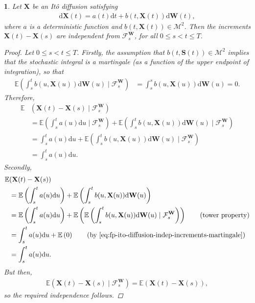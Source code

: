 \documentclass[english]{article}
\numberwithin{equation}{section}
\numberwithin{figure}{section}
\theoremstyle{bolddescit}
\theoremstyle{definition}
\theoremstyle{definition}
\theoremstyle{plain}
\newtheorem{lemma}[theorem]{\protect\lemmaname}
\theoremstyle{plain}
\theoremstyle{bolddesc}
\theoremstyle{plain}
\theoremstyle{remark}
\providecommand{\lemmaname}{Lemma}
\begin{document}
\begin{lemma}\label{lem:fp-ito-diffusion-indep-increments}
  Let $\mathbf{X}$ be an It\^o diffusion satisfying
  \begin{align}\label{eq:fp-ito-diffusion-deterministic-drift}
    \mathrm{d}\mathbf{X}(t) = a(t) \mathrm{d}t + b(t,\mathbf{X}(t)) \mathrm{d}\mathbf{W}(t),
  \end{align}
  where $a$ is a deterministic function and $b(t,\mathbf{X}(t)) \in \mathcal{M}^2$. Then the increments $\mathbf{X}(t) - \mathbf{X}(s)$ are independent from $\mathcal{F}^\mathbf{W}_s$, for all $0 \le s < t \le T$.

  \begin{proof}
    Let $0 \le s < t \le T$. Firstly, the assumption that $b(t,\mathbf{S}(t)) \in \mathcal{M}^2$ implies that the stochastic integral is a martingale (as a function of the upper endpoint of integration), so that
    \begin{align}\label{eq:fp-ito-diffusion-indep-increments-martingale}
      \mathbb{E}\left(\int_s^t b(u,\mathbf{X}(u)) \mathrm{d}\mathbf{W}(u) \mid \mathcal{F}^\mathbf{W}_s\right)
      &= \int_s^s b(u,\mathbf{X}(u)) \mathrm{d}\mathbf{W}(u) = 0.
    \end{align}
    Therefore,
    \begin{align*}
      \mathbb{E}&(\mathbf{X}(t) - \mathbf{X}(s) \mid \mathcal{F}^\mathbf{W}_s)\\
      &= \mathbb{E}\left(\int_s^t a(u) \mathrm{d}u \mid \mathcal{F}^\mathbf{W}_s\right) + \mathbb{E}\left(\int_s^t b(u,\mathbf{X}(u)) \mathrm{d}\mathbf{W}(u) \mid \mathcal{F}^\mathbf{W}_s\right)\\
      &= \int_s^t a(u) \mathrm{d}u + \mathbb{E}\left(\int_s^t b(u,\mathbf{X}(u)) \mathrm{d}\mathbf{W}(u) \mid \mathcal{F}^\mathbf{W}_s\right) \tag{$a$ deterministic}\\
      &= \int_s^t a(u) \mathrm{d}u.
    \end{align*}
    Secondly,
    \begin{align*}
      \mathbb{E}&(\mathbf{X}(t) - \mathbf{X}(s))\\
      &= \mathbb{E}\left(\int_s^t a(u) \mathrm{d}u\right) + \mathbb{E}\left(\int_s^t b(u,\mathbf{X}(u)) \mathrm{d}\mathbf{W}(u)\right)\\
      &= \mathbb{E}\left(\int_s^t a(u) \mathrm{d}u\right) + \mathbb{E}\left(\mathbb{E}\left(\int_s^t b(u,\mathbf{X}(u)) \mathrm{d}\mathbf{W}(u) \mid \mathcal{F}^\mathbf{W}_s\right)\right) \tag{tower property}\\
      &= \int_s^t a(u) \mathrm{d}u + \mathbb{E}\left(0\right) \tag{by \eqref{eq:fp-ito-diffusion-indep-increments-martingale}}\\
      &= \int_s^t a(u) \mathrm{d}u.
    \end{align*}
    But then,
    \begin{align*}
      \mathbb{E}(\mathbf{X}(t) - \mathbf{X}(s) \mid \mathcal{F}^\mathbf{W}_s)
      = \mathbb{E}(\mathbf{X}(t) - \mathbf{X}(s)),
    \end{align*}
    so the required independence follows.
  \end{proof}
\end{lemma}
\end{document}
